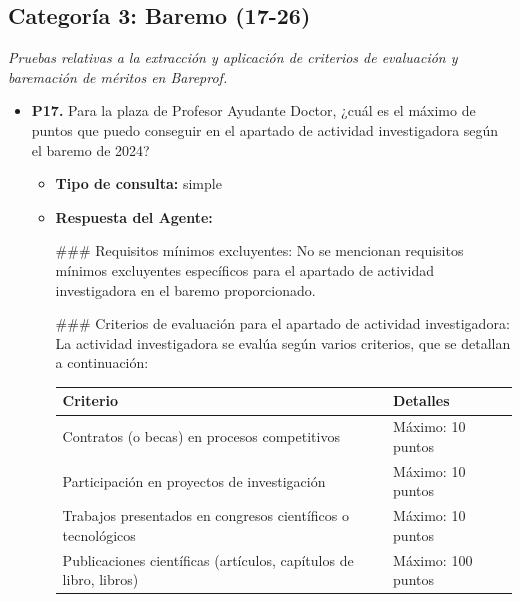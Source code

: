 \documentclass{article}
\begin{document}
\subsection{Categoría 3: Baremo (17-26)}
\textit{Pruebas relativas a la extracción y aplicación de criterios de evaluación y baremación de méritos en Bareprof.}
\begin{itemize}
  \item \textbf{P17.} Para la plaza de Profesor Ayudante Doctor, ¿cuál es el máximo de puntos que puedo conseguir en el apartado de actividad investigadora según el baremo de 2024? \\
        \begin{itemize}
          \item \textbf{Tipo de consulta:} simple
          \item \textbf{Respuesta del Agente:}

                \#\#\# Requisitos mínimos excluyentes:
                No se mencionan requisitos mínimos excluyentes específicos para el apartado de actividad investigadora en el baremo proporcionado.

                \#\#\# Criterios de evaluación para el apartado de actividad investigadora:
                La actividad investigadora se evalúa según varios criterios, que se detallan a continuación:

                \vspace{0.4cm}
                \begin{table}[h!]\centering\renewcommand{\arraystretch}{1.3}
                  \begin{tabular}{|p{}|p{}|}\hline
                    Criterio                                                          & Detalles           \\\hline
                    Contratos (o becas) en procesos competitivos                      & Máximo: 10 puntos  \\\hline
                    Participación en proyectos de investigación                       & Máximo: 10 puntos  \\\hline
                    Trabajos presentados en congresos científicos o tecnológicos      & Máximo: 10 puntos  \\\hline
                    Publicaciones científicas (artículos, capítulos de libro, libros) & Máximo: 100 puntos \\\hline
                  \end{tabular}\end{table}
                \vspace{0.4cm}


\end{itemize}
\end{itemize}
\end{document}
